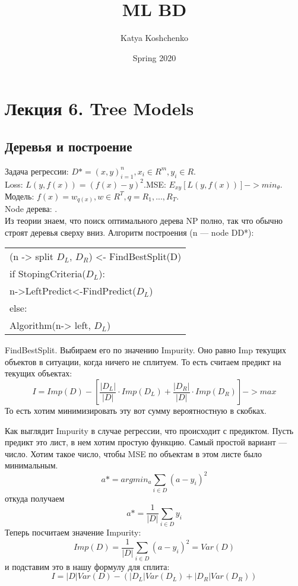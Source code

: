 \documentclass[12pt]{article}
\title{ML BD}
\date{Spring 2020}
\begin{document}
\author{Katya Koshchenko}
\maketitle

\section{Лекция 6. Tree Models}

\subsection{Деревья и построение}

Задача регрессии: $D* = {(x, y)}^n_{i=1}, x_i \in R^m, y_i \in R$.\\

Loss: $L(y, f(x)) = (f(x)-y)^2$.\quad    MSE: $E_{xy}[L(y, f(x))] -> min_\theta$.\\

Модель: $f(x) = w_{q(x)}, w \in R^T, q={R_1, ..., R_T}$.\\

Node дерева: .\\

Из теории знаем, что поиск оптимального дерева NP полно, так что обычно строят деревья сверху вниз. Алгоритм построения (n --- node D\subset D*):

\begin{center}
\begin{tabular}{l}
(n -> split $D_L$, $D_R$) <- FindBestSplit(D)\\
if StopingCriteria($D_L$):\\
\quad n->LeftPredict<-FindPredict($D_L$)\\
else:\\
\quad Algorithm(n-> left, $D_L$)\\
\end{tabular}
\end{center}

FindBestSplit. Выбираем его по значению Impurity. Оно равно Imp текущих объектов в ситуации, когда ничего не сплитуем. То есть считаем предикт на текущих объектах:
$$I = Imp(D) - [\frac{|D_L|}{|D|} \cdot Imp(D_L) + \frac{|D_R|}{|D|} \cdot Imp(D_R)] -> max$$
То есть хотим минимизировать эту вот сумму вероятностную в скобках.

Как выглядит Impurity в случае регрессии, что происходит с предиктом. Пусть предикт это лист, в нем хотим простую функцию. Самый простой вариант --- число. Хотим такое число, чтобы MSE по объектам в этом листе было минимальным.
$$a* = argmin_a {\sum_{i \in D} {(a-y_i)^2}}$$
откуда получаем
$$a*=\frac{1}{|D|}\sum_{i \in D} {y_i}$$
Теперь посчитаем значение Impurity:
$$Imp(D) = \frac{1}{|D|} \sum_{i \in D} {(a-y_i)^2} = Var(D)$$
и подставим это в нашу формулу для сплита:
$$I = |D|Var(D) - (|D_L|Var(D_L) + |D_R|Var(D_R))$$
\end{document}
